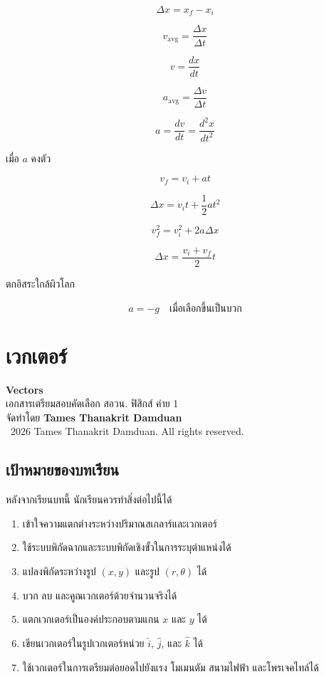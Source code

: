 \documentclass[12pt,a4paper]{report}
\begin{document}
\begin{tcolorbox}[title=สรุปบทที่ 1]
\[
\Delta x=x_f-x_i
\]

\[
v_{\text{avg}}=\frac{\Delta x}{\Delta t}
\]

\[
v=\frac{dx}{dt}
\]

\[
a_{\text{avg}}=\frac{\Delta v}{\Delta t}
\]

\[
a=\frac{dv}{dt}=\frac{d^2x}{dt^2}
\]

เมื่อ $a$ คงตัว

\[
v_f=v_i+at
\]

\[
\Delta x=v_it+\frac{1}{2}at^2
\]

\[
v_f^2=v_i^2+2a\Delta x
\]

\[
\Delta x=\frac{v_i+v_f}{2}t
\]

ตกอิสระใกล้ผิวโลก

\[
a=-g
\quad \text{เมื่อเลือกขึ้นเป็นบวก}
\]
\end{tcolorbox}



\chapter{เวกเตอร์}

\begin{center}
    {\Large \textbf{Vectors}}\\[4pt]
    {\normalsize เอกสารเตรียมสอบคัดเลือก สอวน. ฟิสิกส์ ค่าย 1}\\[6pt]
    {\normalsize จัดทำโดย \textbf{Tames Thanakrit Damduan}}\\[2pt]
    {\footnotesize \textcopyright\ 2026 Tames Thanakrit Damduan. All rights reserved.}\\[8pt]
\end{center}

\section*{เป้าหมายของบทเรียน}

หลังจากเรียนบทนี้ นักเรียนควรทำสิ่งต่อไปนี้ได้

\begin{enumerate}
    \item เข้าใจความแตกต่างระหว่างปริมาณสเกลาร์และเวกเตอร์
    \item ใช้ระบบพิกัดฉากและระบบพิกัดเชิงขั้วในการระบุตำแหน่งได้
    \item แปลงพิกัดระหว่างรูป $(x,y)$ และรูป $(r,\theta)$ ได้
    \item บวก ลบ และคูณเวกเตอร์ด้วยจำนวนจริงได้
    \item แตกเวกเตอร์เป็นองค์ประกอบตามแกน $x$ และ $y$ ได้
    \item เขียนเวกเตอร์ในรูปเวกเตอร์หน่วย $\hat{i}$, $\hat{j}$, และ $\hat{k}$ ได้
    \item ใช้เวกเตอร์ในการเตรียมต่อยอดไปยังแรง โมเมนตัม สนามไฟฟ้า และโพรเจคไทล์ได้
\end{enumerate}
\end{document}
